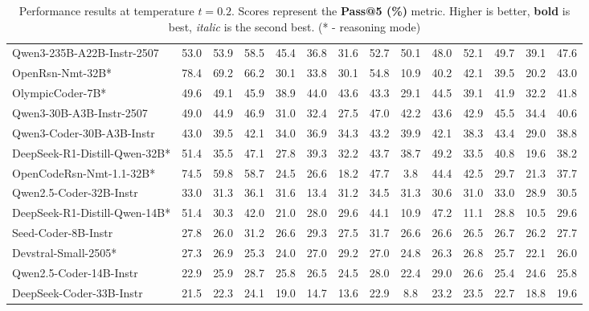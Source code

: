 \documentclass{llmxive}
\begin{document}
\begin{table}[hbt]
{\begin{tabular}{l *{13}{c}}
\rowcolor{gray!10}		
Qwen3-235B-A22B-Instr-2507&	53.0&	53.9&	58.5&	45.4&	36.8&	31.6&	52.7&	50.1&	48.0&	52.1&	49.7&	39.1&	47.6\\															
OpenRsn-Nmt-32B*&	78.4&	69.2&	66.2&	30.1&	33.8&	30.1&	54.8&	10.9&	40.2&	42.1&	39.5&	20.2&	43.0\\													\rowcolor{gray!10}
OlympicCoder-7B*&	49.6&	49.1&	45.9&	38.9&	44.0&	43.6&	43.3&	29.1&	44.5&	39.1&	41.9&	32.2&	41.8\\															
Qwen3-30B-A3B-Instr-2507&	49.0&	44.9&	46.9&	31.0&	32.4&	27.5&	47.0&	42.2&	43.6&	42.9&	45.5&	34.4&	40.6\\			

\rowcolor{gray!10}
Qwen3-Coder-30B-A3B-Instr&	43.0&	39.5&	42.1&	34.0&	36.9&	34.3&	43.2&	39.9&	42.1&	38.3&	43.4&	29.0&	38.8\\														
DeepSeek-R1-Distill-Qwen-32B*&	51.4&	35.5&	47.1&	27.8&	39.3&	32.2&	43.7&	38.7&	49.2&	33.5&	40.8&	19.6&	38.2\\	

\rowcolor{gray!10}
OpenCodeRsn-Nmt-1.1-32B*&	74.5&	59.8&	58.7&	24.5&	26.6&	18.2&	47.7&	3.8&	44.4&	42.5&	29.7&	21.3&	37.7\\															
Qwen2.5-Coder-32B-Instr&	33.0&	31.3&	36.1&	31.6&	13.4&	31.2&	34.5&	31.3&	30.6&	31.0&	33.0&	28.9&	30.5\\		

\rowcolor{gray!10}
DeepSeek-R1-Distill-Qwen-14B*&	51.4&	30.3&	42.0&	21.0&	28.0&	29.6&	44.1&	10.9&	47.2&	11.1&	28.8&	10.5&	29.6\\															
Seed-Coder-8B-Instr&	27.8&	26.0&	31.2&	26.6&	29.3&	27.5&	31.7&	26.6&	26.6&	26.5&	26.7&	26.2&	27.7\\	

\rowcolor{gray!10}
Devstral-Small-2505*&	27.3&	26.9&	25.3&	24.0&	27.0&	29.2&	27.0&	24.8&	26.3&	26.8&	25.7&	22.1&	26.0\\															
Qwen2.5-Coder-14B-Instr&	22.9&	25.9&	28.7&	25.8&	26.5&	24.5&	28.0&	22.4&	29.0&	26.6&	25.4&	24.6&	25.8\\	

\rowcolor{gray!10}
DeepSeek-Coder-33B-Instr &	21.5&	22.3&	24.1&	19.0&	14.7&	13.6&	22.9&	8.8&	23.2&	23.5&	22.7&	18.8&	19.6\\														

\bottomrule
\end{tabular}%
}
\caption{Performance results at temperature $t=0.2$. Scores represent the \textbf{Pass@5 (\%)} metric. Higher is better, \textbf{bold} is best, \textit{italic} is the second best. (* - reasoning mode)}
\label{tab_exps_feb25_pass5_t0.2}
\end{table}
\end{document}
